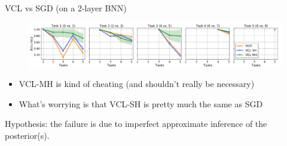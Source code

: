 \documentclass[12pt,aspectratio=169, handout]{beamer}
\let\olditem\item
\renewcommand\item{\olditem\justifying}
\begin{document}
\begin{frame}{VCL vs SGD (on a 2-layer BNN)}

\begin{figure}
    \centering
    \includegraphics[width=\textwidth]{"images/Fig1_pic.png"}
\end{figure}

\pause
\begin{itemize}[<+->]
    \item VCL-MH is kind of cheating (and shouldn't really be necessary)
    \item What's worrying is that VCL-SH is pretty much the same as SGD
\end{itemize}

\pause
Hypothesis: the failure is due to imperfect approximate inference of the posterior(s).

\end{frame}

\end{document}
